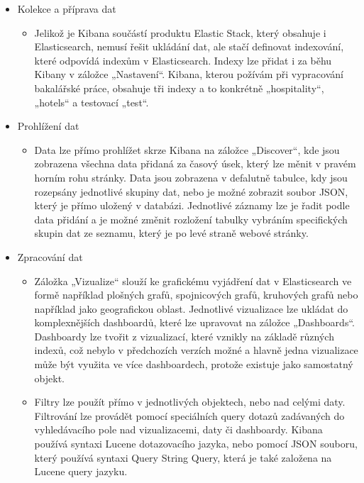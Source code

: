 \documentclass[czech,BP]{thesiskiv}
\begin{document}
 \begin{itemize}
 	\item Kolekce a příprava dat
 	\begin{itemize}
 		\item Jelikož je Kibana součástí produktu Elastic Stack, který obsahuje i Elasticsearch, nemusí řešit ukládání dat, ale stačí definovat indexování, které odpovídá indexům v Elasticsearch. Indexy lze přidat i za běhu Kibany v záložce „Nastavení“. Kibana, kterou požívám při vypracování bakalářské práce, obsahuje tři indexy a to konkrétně „hospitality“, „hotels“ a testovací „test“. 
 	\end{itemize}
	\item Prohlížení dat
	\begin{itemize}
		\item Data lze přímo prohlížet skrze Kibana na záložce „Discover“, kde jsou zobrazena všechna data přidaná za časový úsek, který lze měnit v pravém horním rohu stránky. Data jsou zobrazena v defalutně tabulce, kdy jsou rozepsány jednotlivé skupiny dat, nebo je možné zobrazit soubor JSON, který je přímo uložený  v databázi. Jednotlivé záznamy lze je řadit podle data přidání a je možné změnit rozložení tabulky vybráním specifických skupin dat ze seznamu, který je po levé straně webové stránky.
	\end{itemize}
 	\item Zpracování dat
 	\begin{itemize}
 		\item Záložka „Vizualize“ slouží ke grafickému vyjádření dat v Elasticsearch ve formě například plošných grafů, spojnicových grafů, kruhových grafů nebo například jako geografickou oblast. Jednotlivé vizualizace lze ukládat do komplexnějších dashboardů, které lze upravovat na záložce „Dashboards“. Dashboardy lze tvořit z vizualizací, které vznikly na základě různých indexů, což nebylo v předchozích verzích možné a hlavně jedna vizualizace může být využita ve více dashboardech, protože existuje jako samostatný objekt.
 		
 		\item Filtry lze použít přímo v jednotlivých objektech, nebo nad celými daty. Filtrování lze provádět pomocí speciálních query dotazů zadávaných do vyhledávacího pole nad vizualizacemi, daty či dashboardy. Kibana používá syntaxi Lucene dotazovacího jazyka, nebo pomocí JSON souboru, který používá syntaxi  Query String Query, která je také založena na Lucene query jazyku.
 	\end{itemize}
 \end{itemize}
 
\end{document}

